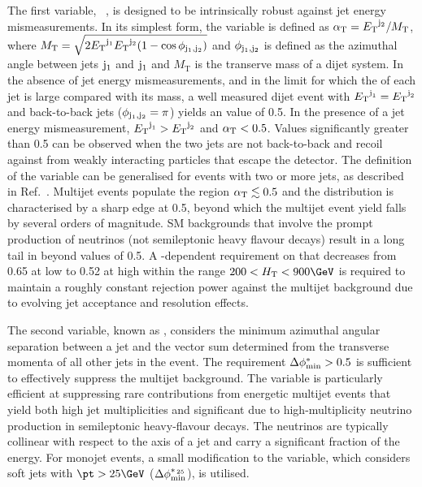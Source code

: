 The first variable, \alphat~\cite{Randall:2008rw, RA1Paper}, is
designed to be intrinsically robust against jet energy
mismeasurements. In its simplest form, the \alphat variable is defined
as $\alpha_{\text{T}} = {E_{\text T}}^{\rm j_2}/M_\text{T}$, where $M_\textrm{T} = \sqrt{
  2 {E_{\text T}}^{\rm j_1} {E_{\text T}}^{\rm j_2} (1 - \cos\phi_{\rm j_1,j_2})}$ and
$\phi_{\rm j_1,j_2}$ is defined as the azimuthal angle between jets
${\rm j_1}$ and ${\rm j_1}$ and $M_\textrm{T}$ is the transerve mass
of a dijet system. In the absence of jet energy mismeasurements, and
in the limit for which the \Et of each jet is large compared with its
mass, a well measured dijet event with ${E_{\text T}}^{\text{j}_\text{1}} =
{E_{\text T}}^{\text{j}_\text{2}}$ and back-to-back jets ($\phi_{\rm j_1,j_2} = \pi$)
yields an \alphat value of 0.5. In the presence of a jet energy
mismeasurement, ${E_{\text T}}^{\text{j}_\text{1}} > {E_{\text T}}^{\text{j}_\text{2}}$ and $\alpha_{\text{T}}
< 0.5$. Values significantly greater than 0.5 can be observed when the
two jets are not back-to-back and recoil against \ptvecmiss from
weakly interacting particles that escape the detector. The definition
of the \alphat variable can be generalised for events with two or more
jets, as described in Ref.~\cite{}. Multijet events populate the
region $\alpha_{\text{T}} \lesssim 0.5$ and the \alphat distribution is
characterised by a sharp edge at 0.5, beyond which the multijet event
yield falls by several orders of magnitude. SM backgrounds that
involve the prompt production of neutrinos (\eg not semileptonic heavy
flavour decays) result in a long tail in \alphat beyond values of
0.5. A \scalht-dependent requirement on \alphat that decreases from
0.65 at low \scalht to 0.52 at high \scalht within the range $200 <
\scalht < 900\GeV$ is required to maintain a roughly constant
rejection power against the multijet background due to evolving jet
acceptance and resolution effects.

The second variable, known as \bdphi, considers the minimum azimuthal
angular separation between a jet and the vector sum determined from
the transverse momenta of all other jets in the event. The requirement
$\Delta\phi^{*}_\text{min} > 0.5$ is sufficient to effectively suppress the multijet
background. The \bdphi variable is particularly efficient at
suppressing rare contributions from energetic multijet events that
yield both high jet multiplicities and significant \met due to
high-multiplicity neutrino production in semileptonic heavy-flavour
decays. The neutrinos are typically collinear with respect to the axis
of a jet and carry a significant fraction of the energy. For monojet
events, a small modification to the \bdphi variable, which considers
soft jets with $\pt > 25\GeV$ ($\Delta\phi^{*_{\, 25}}_\text{min}$), is utilised. 

